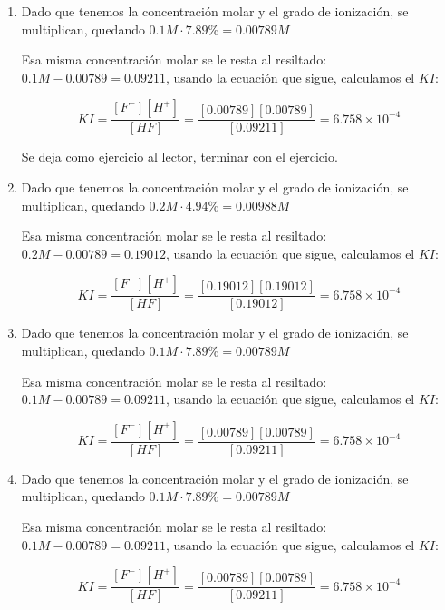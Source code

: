 \begin{enumerate}
	\item Dado que tenemos la concentración molar y el grado de ionización, se multiplican, quedando $0.1M \cdot 7.89\%=0.00789M$

	      Esa misma concentración molar se le resta al resiltado: $0.1M-0.00789=0.09211$, usando la ecuación que sigue, calculamos el $KI$:

	      \begin{equation*}
		      KI=\frac{[F^-][H^+]}{[HF]}=\frac{[0.00789][0.00789]}{[0.09211]}=6.758\times 10^{-4}
	      \end{equation*}

	      Se deja como ejercicio al lector, terminar con el ejercicio.

	\item Dado que tenemos la concentración molar y el grado de ionización, se multiplican, quedando $0.2M \cdot 4.94\%=0.00988M$

	      Esa misma concentración molar se le resta al resiltado: $0.2M-0.00789=0.19012$, usando la ecuación que sigue, calculamos el $KI$:

	      \begin{equation*}
		      KI=\frac{[F^-][H^+]}{[HF]}=\frac{[0.19012][0.19012]}{[0.19012]}=6.758\times 10^{-4}
	      \end{equation*}

	\item Dado que tenemos la concentración molar y el grado de ionización, se multiplican, quedando $0.1M \cdot 7.89\%=0.00789M$

	      Esa misma concentración molar se le resta al resiltado: $0.1M-0.00789=0.09211$, usando la ecuación que sigue, calculamos el $KI$:

	      \begin{equation*}
		      KI=\frac{[F^-][H^+]}{[HF]}=\frac{[0.00789][0.00789]}{[0.09211]}=6.758\times 10^{-4}
	      \end{equation*}

	\item Dado que tenemos la concentración molar y el grado de ionización, se multiplican, quedando $0.1M \cdot 7.89\%=0.00789M$

	      Esa misma concentración molar se le resta al resiltado: $0.1M-0.00789=0.09211$, usando la ecuación que sigue, calculamos el $KI$:

	      \begin{equation*}
		      KI=\frac{[F^-][H^+]}{[HF]}=\frac{[0.00789][0.00789]}{[0.09211]}=6.758\times 10^{-4}
	      \end{equation*}
\end{enumerate}


